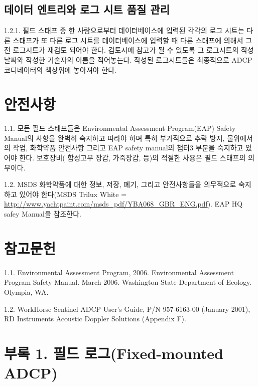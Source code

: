 \documentclass[
]{book}
\begin{document}
\hypertarget{uxb370uxc774uxd130-uxc5d4uxd2b8uxb9acuxc640-uxb85cuxadf8-uxc2dcuxd2b8-uxd488uxc9c8-uxad00uxb9ac}{%
\subsection{데이터 엔트리와 로그 시트 품질 관리}\label{uxb370uxc774uxd130-uxc5d4uxd2b8uxb9acuxc640-uxb85cuxadf8-uxc2dcuxd2b8-uxd488uxc9c8-uxad00uxb9ac}}

1.2.1. 필드 스태프 중 한 사람으로부터 데이터베이스에 입력된 각각의 로그 시트는 다른 스태프가 또 다른 로그 시트를 데이터베이스에 입력할 때 다른 스태프에 의해서 그 전 로그시트가 재검토 되어야 한다. 검토시에 참고가 될 수 있도록 그 로그시트의 작성날짜와 작성한 기술자의 이름을 적어놓는다. 작성된 로그시트들은 최종적으로 ADCP 코디네이터의 책상위에 놓아져야 한다.

\hypertarget{uxc548uxc804uxc0acuxd56d}{%
\section{안전사항}\label{uxc548uxc804uxc0acuxd56d}}

1.1. 모든 필드 스태프들은 Environmental Assessment Program(EAP) Safety Manual의 사항을 완벽히 숙지하고 따라야 하며 특히 부가적으로 추락 방지, 물위에서의 작업, 화학약품 안전사항 그리고 EAP safety manual의 챕터3 부분을 숙지하고 있어야 한다. 보호장비( 합성고무 장갑, 가죽장갑, 등)의 적절한 사용은 필드 스태프의 의무이다.

1.2. MSDS 화학약품에 대한 정보, 저장, 폐기, 그리고 안전사항들을 의무적으로 숙지하고 있어야 한다(MSDS Trilux White = \url{http://www.yachtpaint.com/msds_pdf/YBA068_GBR_ENG.pdf}). EAP HQ safey Manual을 참조한다.

\hypertarget{uxcc38uxace0uxbb38uxd5cc-3}{%
\section{참고문헌}\label{uxcc38uxace0uxbb38uxd5cc-3}}

1.1. Environmental Assessment Program, 2006. Environmental Assessment Program Safety Manual. March 2006. Washington State Department of Ecology. Olympia, WA.

1.2. WorkHorse Sentinel ADCP User's Guide, P/N 957-6163-00 (January 2001), RD Instruments Acoustic Doppler Solutions (Appendix F).

\hypertarget{uxbd80uxb85d-1.-uxd544uxb4dc-uxb85cuxadf8fixed-mounted-adcp}{%
\section{부록 1. 필드 로그(Fixed-mounted ADCP)}\label{uxbd80uxb85d-1.-uxd544uxb4dc-uxb85cuxadf8fixed-mounted-adcp}}
\end{document}
